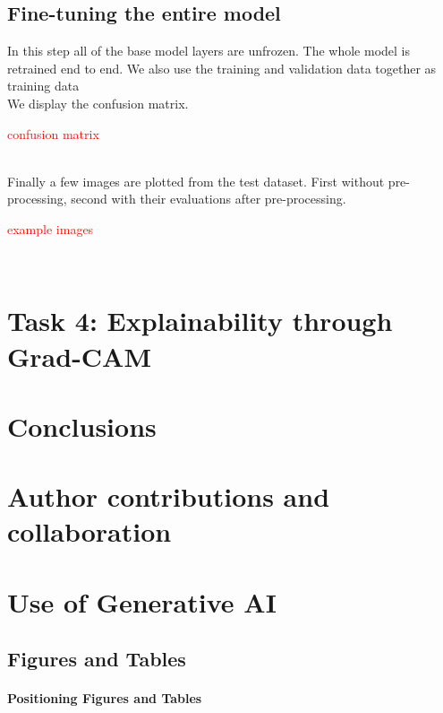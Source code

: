 \documentclass[conference]{IEEEtran}
\begin{document}
\subsection{Fine-tuning the entire model}
In this step all of the base model layers are unfrozen. The whole model is retrained end to end. We also use the training and validation data together as training data\\

We display the confusion matrix. \\

\centerline{\textcolor{red}{confusion matrix}}\\

Finally a few images are plotted from the test dataset. First without pre-processing, second with their evaluations after pre-processing.\\

\centerline{\textcolor{red}{example images}}\\	








\section{Task 4: Explainability through Grad-CAM}
\section{Conclusions}
\section{Author contributions and collaboration}
\section{Use of Generative AI}


\subsection{Figures and Tables}
\paragraph{Positioning Figures and Tables}
\end{document}
